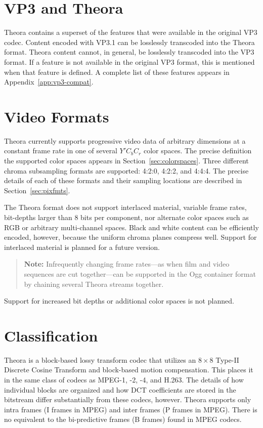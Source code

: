 \documentclass[9pt,letterpaper]{book}
\numberwithin{equation}{chapter}
\numberwithin{figure}{chapter}
\numberwithin{table}{chapter}
\begin{document}
\section{VP3 and Theora}

Theora contains a superset of the features that were available in the original
 VP3 codec.
Content encoded with VP3.1 can be losslessly transcoded into the Theora format.
Theora content cannot, in general, be losslessly transcoded into the VP3
 format.
If a feature is not available in the original VP3 format, this is mentioned
 when that feature is defined.
A complete list of these features appears in Appendix~\ref{app:vp3-compat}.

\section{Video Formats}

Theora currently supports progressive video data of arbitrary dimensions at a
 constant frame rate in one of several $Y'C_bC_r$ color spaces.
The precise definition the supported color spaces appears in
 Section~\ref{sec:colorspaces}.
Three different chroma subsampling formats are supported: 4:2:0, 4:2:2,
 and 4:4:4.
The precise details of each of these formats and their sampling locations are
 described in Section~\ref{sec:pixfmts}.

The Theora format does not support interlaced material, variable frame rates,
 bit-depths larger than 8 bits per component, nor alternate color spaces such
 as RGB or arbitrary multi-channel spaces.
Black and white content can be efficiently encoded, however, because the
 uniform chroma planes compress well.
Support for interlaced material is planned for a future version.
\begin{verse}
{\bf Note:} Infrequently changing frame rates---as when film and video
 sequences are cut together---can be supported in the Ogg container format by
 chaining several Theora streams together.
\end{verse}
Support for increased bit depths or additional color spaces is not planned.

\section{Classification}

Theora is a block-based lossy transform codec that utilizes an
 $8\times 8$ Type-II Discrete Cosine Transform and block-based motion
 compensation.
This places it in the same class of codecs as MPEG-1, -2, -4, and H.263.
The details of how individual blocks are organized and how DCT coefficients are
 stored in the bitstream differ substantially from these codecs, however.
Theora supports only intra frames (I frames in MPEG) and inter frames (P frames
 in MPEG).
There is no equivalent to the bi-predictive frames (B frames) found in MPEG
 codecs.
\end{document}

